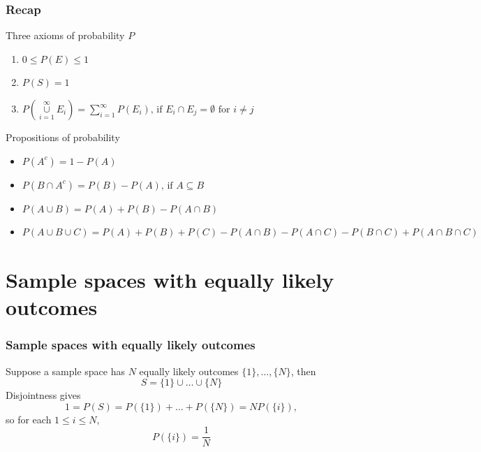 \documentclass[slidestop,compress,mathserif]{beamer}
\begin{document}
\begin{frame}\frametitle{Recap}

Three axioms of probability $P$
\begin{enumerate}
\item $0 \leq P(E)  \leq 1$
\item $P(S) =  1$
\item $P\left(\underset{i=1}{\overset{\infty}{\cup}} E_i\right) = \sum_{i=1}^\infty P(E_i) \text{,  if } E_i \cap E_j=\emptyset \text{ for } i \neq j$
\end{enumerate}

 
Propositions of probability
\begin{itemize}
\item $P(A^c) = 1-P(A)$
\item $P(B \cap A^c) = P(B)-P(A) \text{, if } A \subseteq B$
\item $P(A \cup B) = P(A) + P(B) - P(A \cap B)$
\item $P(A \cup B \cup C) = P(A) + P(B) + P(C) - P(A \cap B) - P(A \cap C)  - P(B \cap C) + P(A \cap B \cap C)$
\end{itemize}


\end{frame}





\section{Sample spaces with equally likely outcomes}
\begin{frame}\frametitle{Sample spaces with equally likely outcomes}
\begin{dinglist}{\DingListSymbolA}
\item Suppose a sample space has $N$ equally likely outcomes $\{1\}, \ldots, \{N\}$, then
\[
S = \{1\} \cup \ldots \cup \{N\}
\]
Disjointness gives
\[
1 = P(S) = P(\{1\}) + \ldots + P(\{N\}) = NP(\{i\}),
\]
so for each $1\leq i \leq N$,
\[
P(\{i\}) = \frac{1}{N}
\]

\end{dinglist}
\end{frame}
\end{document}
